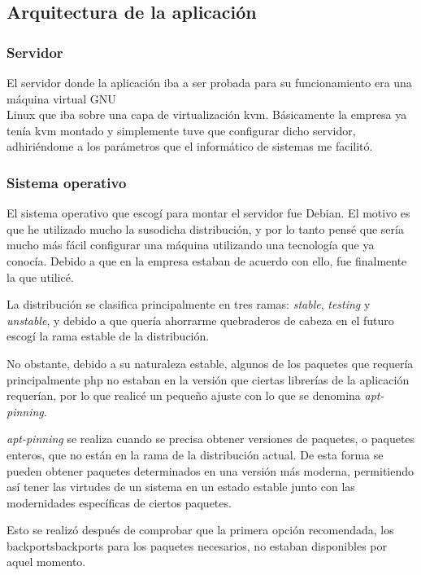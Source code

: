 \subsection{Arquitectura de la aplicación}
\subsubsection{Servidor}
El servidor donde la aplicación iba a ser probada para su funcionamiento era
una máquina virtual GNU\\Linux que iba sobre una capa de
virtualización \gls{kvm}. Básicamente la empresa ya tenía \gls{kvm} montado y
simplemente tuve que configurar dicho servidor, adhiriéndome a los parámetros
que el informático de sistemas me facilitó.

\subsubsection{Sistema operativo}
El sistema operativo que escogí para montar el servidor fue Debian. El motivo
es que he utilizado mucho la susodicha distribución, y por lo tanto pensé que
sería mucho más fácil configurar una máquina utilizando una tecnología que ya
conocía. Debido a que en la empresa estaban de acuerdo con ello, fue finalmente
la que utilicé.

La distribución se clasifica principalmente en tres ramas: \textit{stable},
\textit{testing} y \textit{unstable}, y debido a que quería ahorrarme
quebraderos de cabeza en el futuro escogí la rama estable de la distribución.

No obstante, debido a su naturaleza estable, algunos de los paquetes que
requería \textemdash principalmente \gls{php} \textemdash no estaban en la
versión que ciertas librerías de la aplicación requerían, por lo que realicé
un pequeño ajuste con lo que se denomina \textit{apt-pinning}.

\textit{apt-pinning} se realiza cuando se precisa obtener versiones de
paquetes, o paquetes enteros, que no están en la rama de la distribución
actual. De esta forma se pueden obtener paquetes determinados en una versión
más moderna, permitiendo así tener las virtudes de un sistema en un estado
estable junto con las modernidades específicas de ciertos paquetes.

Esto se realizó después de comprobar que la primera opción recomendada,
los \gls{backports}{backports} para los paquetes necesarios, no estaban
disponibles por aquel momento.

